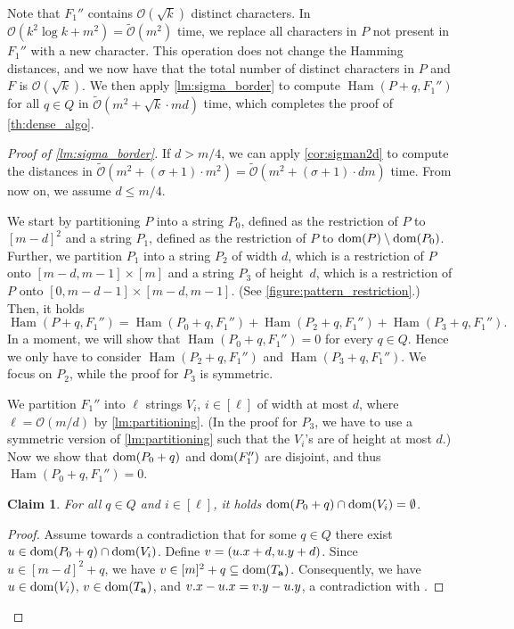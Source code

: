 \documentclass[twoside,leqno]{article}
\newtheorem{claim}{Claim}[section]
\renewcommand{\O}{\mathcal{O}}
\newcommand{\tO}{\tilde{\mathcal{O}}}
\DeclareMathOperator*{\Ham}{Ham}
\begin{document}
Note that $F_1''$ contains $\O(\sqrt{k})$ distinct characters. In $\O(k^2 \log k + m^2) = \tO(m^2)$ time, we replace all characters in $P$ not present in $F_1''$ with a new character. This operation does not change the Hamming distances, and we now have that the total number of distinct characters in $P$ and $F$ is $\O(\sqrt{k})$. We then apply \cref{lm:sigma_border} to compute $\Ham(P + q, F_1'')$ for all $q \in Q$ in $\tO(m^2 + \sqrt k \cdot md)$ time, which completes the proof of \cref{th:dense_algo}. 
\begin{proof}[{Proof of \cref{lm:sigma_border}}]
If $d > m/4$, we can apply \cref{cor:sigman2d} to compute the distances in $\tO(m^2 + (\sigma+1) \cdot m^2) = \tO(m^2 + (\sigma+1) \cdot dm)$ time. From now on, we assume $d \le m / 4$. 

We start by partitioning $P$ into a string $P_0$, defined as the restriction of $P$ to $[m - d]^2$ and a string $P_1$, defined as the restriction of $P$ to $\operatorname*{dom}(P) \setminus \operatorname*{dom}(P_0)$.
Further, we partition $P_1$ into a string $P_2$ of width $d$, which is a restriction of $P$ onto $[m-d,m - 1]\times [m]$ and a string $P_3$ of height~$d$, which is a restriction of $P$ onto $[0, m-d-1] \times [m-d,m -1]$. (See \cref{figure:pattern_restriction}.) Then, it holds
%
\[ \Ham(P + q, F_1'') = \Ham(P_0 + q, F_1'') + \Ham(P_2 + q, F_1'') + \Ham(P_3 + q, F_1'').\]
%
In a moment, we will show that $\Ham(P_0 + q, F_1'') = 0$ for every $q \in Q$. Hence we only have to consider $\Ham(P_2 + q, F_1'')$ and $\Ham(P_3 + q, F_1'')$. We focus on $P_2$, while the proof for $P_3$ is symmetric.

We partition $F_1''$ into $\ell$ strings $V_i$, $i\in [\ell]$ of width at most $d$, where $\ell = \O(m/d)$ by \cref{lm:partitioning}. (In the proof for $P_3$, we have to use a symmetric version of \cref{lm:partitioning} such that the $V_i$'s are of height at most $d$.) Now we show that $\operatorname*{dom}(P_0+q)$ and $\operatorname*{dom}(F_1'')$ are disjoint, and thus $\Ham(P_0 + q, F_1'') = 0$.

\begin{claim}\label{border_hamming_reduction}
For all $q \in Q$ and $i \in [\ell]$, it holds $\operatorname*{dom}(P_0 + q) \cap \operatorname*{dom}(V_i) = \emptyset$.
\end{claim}
\begin{proof}
Assume towards a contradiction that for some $q \in Q$ there exist $u \in \operatorname*{dom}(P_0 + q) \cap \operatorname*{dom}(V_i)$. Define $v = (u.x + d, u.y + d)$. Since $u \in [m - d]^2 + q$, we have $v \in [m]^2 + q \subseteq \operatorname*{dom}(T_\mathbf{a})$. Consequently, we have $u \in \operatorname*{dom}(V_i)$, $v \in \operatorname*{dom}(T_\mathbf{a})$, and $v.x - u.x = v.y - u.y$, a contradiction with .
\end{proof}



\end{proof}
\end{document}
